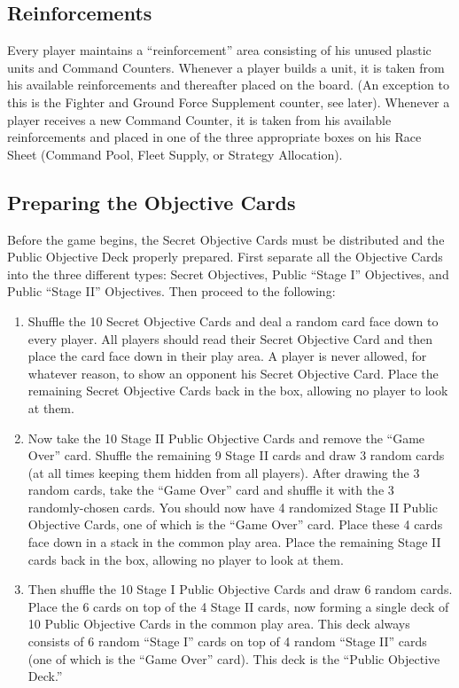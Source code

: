 \documentclass[11pt,fleqn]{book} %
\begin{document}
\subsection{Reinforcements}
Every player maintains a “reinforcement” area consisting of his unused plastic units and Command Counters. Whenever a player builds a unit, it is taken from his available reinforcements and thereafter placed on the board. (An exception to this is the Fighter and Ground Force Supplement counter, see later). Whenever a player receives a new Command Counter, it is taken from his available reinforcements and placed in one of the three appropriate boxes on his Race Sheet (Command Pool, Fleet Supply, or Strategy Allocation).

\subsection{Preparing the Objective Cards}
Before the game begins, the Secret Objective Cards must be distributed and the Public Objective Deck properly prepared. First separate all the Objective Cards into the three different types: Secret Objectives, Public “Stage I” Objectives, and Public “Stage II” Objectives. Then proceed to the following:

\begin{enumerate}
\item Shuffle the 10 Secret Objective Cards and deal a random card face down to every player. All players should read their Secret Objective Card and then place the card face down in their play area. A player is never allowed, for whatever reason, to show an opponent his Secret Objective Card. Place the remaining Secret Objective Cards back in the box, allowing no player to look at them.
\item Now take the 10 Stage II Public Objective Cards and remove the “Game Over” card. Shuffle the remaining 9 Stage II cards and draw 3 random cards (at all times keeping them hidden from all players). After drawing the 3 random cards, take the “Game Over” card and shuffle it with the 3 randomly-chosen cards. You should now have 4 randomized Stage II Public Objective Cards, one of which is the “Game Over” card. Place these 4 cards face down in a stack in the common play area. Place the remaining Stage II cards back in the box, allowing no player to look at them.
\item Then shuffle the 10 Stage I Public Objective Cards and draw 6 random cards. Place the 6 cards on top of the 4 Stage II cards, now forming a single deck of 10 Public Objective Cards in the common play area. This deck always consists of 6 random “Stage I” cards on top of 4 random “Stage II” cards (one of which is the “Game Over” card). This deck is the “Public Objective Deck.”
\end{enumerate}
\end{document}
